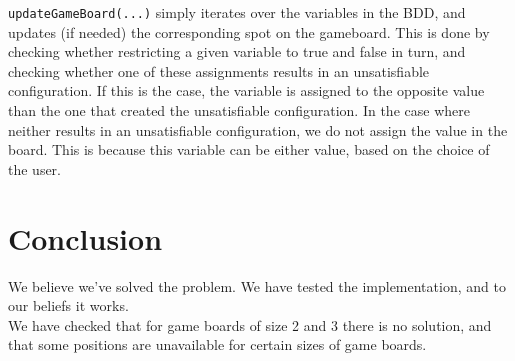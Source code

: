 \texttt{updateGameBoard(...)} simply iterates over the variables in the BDD, and updates (if needed) the corresponding spot on the gameboard. This is done by checking whether restricting a given variable to true and false in turn, and checking whether one of these assignments results in an unsatisfiable configuration. If this is the case, the variable is assigned to the opposite value than the one that created the unsatisfiable configuration. In the case where neither results in an unsatisfiable configuration, we do not assign the value in the board. This is because this variable can be either value, based on the choice of the user.

\section{Conclusion}
We believe we've solved the problem. We have tested the implementation, and to our beliefs it works. \\

We have checked that for game boards of size 2 and 3 there is no solution, and that some positions are unavailable for certain sizes of game boards.
